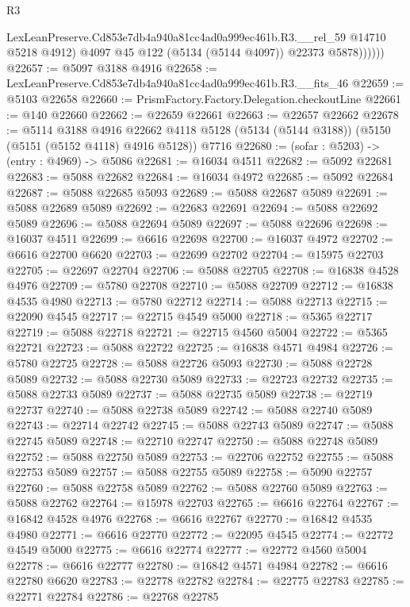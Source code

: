 \begin{lexlean}{R3}
\begin{coremodule}
                LexLeanPreserve.Cd853e7db4a940a81cc4ad0a999ec461b.R3.__rel_59 @14710 @5218 @4912)
                @4097
                @45
                @122
                (@5134 (@5144 @4097))
                @22373
                @5878))))))
@22657 := @5097 @3188 @4916
@22658 := LexLeanPreserve.Cd853e7db4a940a81cc4ad0a999ec461b.R3.__fits_46
@22659 := @5103 @22658
@22660 := PrismFactory.Factory.Delegation.checkoutLine
@22661 := @140 @22660
@22662 := @22659 @22661
@22663 := @22657 @22662
@22678 := @5114
    @3188
    @4916
    @22662
    @4118
    @5128
    (@5134 (@5144 @3188))
    (@5150 (@5151 (@5152 @4118) @4916 @5128))
    @7716
@22680 := (sofar : @5203) -> (entry : @4969) -> @5086
@22681 := @16034 @4511
@22682 := @5092 @22681
@22683 := @5088 @22682
@22684 := @16034 @4972
@22685 := @5092 @22684
@22687 := @5088 @22685 @5093
@22689 := @5088 @22687 @5089
@22691 := @5088 @22689 @5089
@22692 := @22683 @22691
@22694 := @5088 @22692 @5089
@22696 := @5088 @22694 @5089
@22697 := @5088 @22696
@22698 := @16037 @4511
@22699 := @6616 @22698
@22700 := @16037 @4972
@22702 := @6616 @22700 @6620
@22703 := @22699 @22702
@22704 := @15975 @22703
@22705 := @22697 @22704
@22706 := @5088 @22705
@22708 := @16838 @4528 @4976
@22709 := @5780 @22708
@22710 := @5088 @22709
@22712 := @16838 @4535 @4980
@22713 := @5780 @22712
@22714 := @5088 @22713
@22715 := @22090 @4545
@22717 := @22715 @4549 @5000
@22718 := @5365 @22717
@22719 := @5088 @22718
@22721 := @22715 @4560 @5004
@22722 := @5365 @22721
@22723 := @5088 @22722
@22725 := @16838 @4571 @4984
@22726 := @5780 @22725
@22728 := @5088 @22726 @5093
@22730 := @5088 @22728 @5089
@22732 := @5088 @22730 @5089
@22733 := @22723 @22732
@22735 := @5088 @22733 @5089
@22737 := @5088 @22735 @5089
@22738 := @22719 @22737
@22740 := @5088 @22738 @5089
@22742 := @5088 @22740 @5089
@22743 := @22714 @22742
@22745 := @5088 @22743 @5089
@22747 := @5088 @22745 @5089
@22748 := @22710 @22747
@22750 := @5088 @22748 @5089
@22752 := @5088 @22750 @5089
@22753 := @22706 @22752
@22755 := @5088 @22753 @5089
@22757 := @5088 @22755 @5089
@22758 := @5090 @22757
@22760 := @5088 @22758 @5089
@22762 := @5088 @22760 @5089
@22763 := @5088 @22762
@22764 := @15978 @22703
@22765 := @6616 @22764
@22767 := @16842 @4528 @4976
@22768 := @6616 @22767
@22770 := @16842 @4535 @4980
@22771 := @6616 @22770
@22772 := @22095 @4545
@22774 := @22772 @4549 @5000
@22775 := @6616 @22774
@22777 := @22772 @4560 @5004
@22778 := @6616 @22777
@22780 := @16842 @4571 @4984
@22782 := @6616 @22780 @6620
@22783 := @22778 @22782
@22784 := @22775 @22783
@22785 := @22771 @22784
@22786 := @22768 @22785

\end{coremodule}
\end{lexlean}
